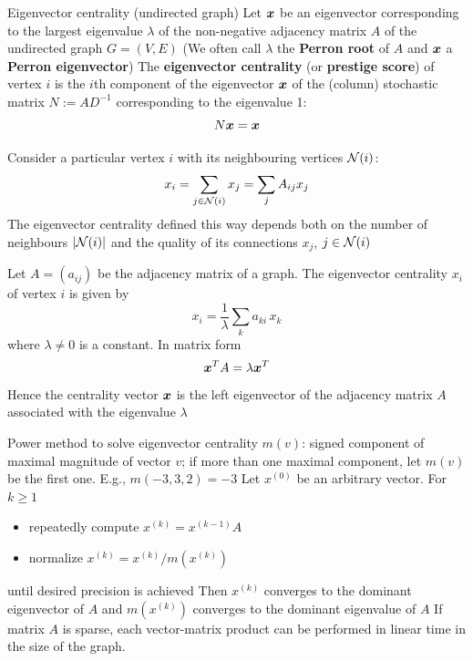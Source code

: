 \documentclass[aspectratio=169]{beamer}\usepackage[]{graphicx}\usepackage[]{xcolor}
\begin{document}
\begin{frame}{Eigenvector centrality (undirected graph)}
Let $\bm{x}$ be an eigenvector corresponding to the largest eigenvalue $\lambda$ of the non-negative adjacency matrix $A$ of the undirected graph $G = (V, E)$
\vfill
(We often call $\lambda$ the \textbf{Perron root} of $A$ and $\bm{x}$ a \textbf{Perron eigenvector})
\vfill
The \textbf{eigenvector centrality} (or \textbf{prestige score}) of vertex $i$ is the $i$th component of the eigenvector $\bm{x}$ of the (column) stochastic matrix $N := AD^{-1}$ corresponding to the eigenvalue 1:
\[
	N\bm{x} = \bm{x}
\]
\end{frame}

\begin{frame}
Consider a particular vertex $i$ with its neighbouring vertices $\mathcal{N}(i)$:
\[
	x_i = \sum_{j\in\mathcal{N}(i)} x_j 
	= \sum_j A_{ij} x_j	
\]
\vfill
The eigenvector centrality defined this way depends both on the number of neighbours $|\mathcal{N}(i)|$ and the quality of its connections $x_j$, $j\in\mathcal{N}(i)$
\end{frame}

\begin{frame}
	Let $A = (a_{ij})$ be the adjacency matrix of a graph. The eigenvector centrality $x_{i}$ of vertex $i$ is given by
	$$
	x_i = \frac{1}{\lambda} \sum_k a_{ki} \, x_k
	$$ 
	where $\lambda \neq 0$ is a constant. In matrix form
	$$
	\bm{x}^T A=\lambda\bm{x}^T
	$$
\vfill
Hence the centrality vector $\bm{x}$ is the left eigenvector of the adjacency matrix $A$ associated with the eigenvalue $\lambda$
\end{frame}


\begin{frame}{Power method to solve eigenvector centrality}
$m(v)$: signed component of maximal magnitude of vector $v$; if more than one maximal component, let $m(v)$ be the first one. E.g., $m(-3,3,2) = -3$
\vfill
Let $x^{(0)}$ be an arbitrary vector. For $k \geq 1$
\begin{itemize}
	\item repeatedly compute $x^{(k)} = x^{(k-1)} A$
	\item normalize $x^{(k)} = x^{(k)} / m(x^{(k)})$
\end{itemize}
until desired precision is achieved
\vfill
Then $x^{(k)}$ converges to the dominant eigenvector of $A$ and $m(x^{(k)})$ converges to the dominant eigenvalue of $A$
\vfill
If matrix $A$ is sparse, each vector-matrix product can be performed in linear time in the size of the graph.
\end{frame}
\end{document}
